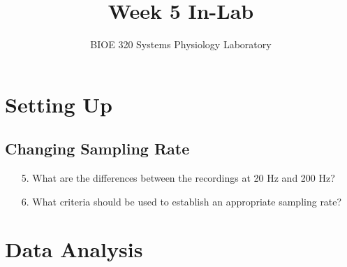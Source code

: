 \documentclass{article}
\title{Week 5 In-Lab}
\author{BIOE 320 Systems Physiology Laboratory}
\date{}
\begin{document}
\large
\maketitle

\section*{Setting Up}
\subsection*{Changing Sampling Rate}
\begin{itemize}
	\item[5.] What are the differences between the recordings at 20 Hz and 200 Hz?\vspace{3cm}
	\item[6.] What criteria should be used to establish an appropriate sampling rate?\vspace{3cm}
\end{itemize}

\section*{Data Analysis}
\end{document}
